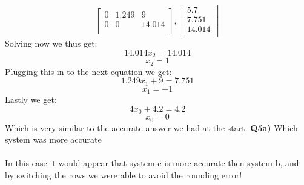 \documentclass[12pt]{article}
\begin{document}
\begin{adjustwidth}{0em}{0pt}
\[\begin{bmatrix}
0 & 1.249 & 9 \\
0 & 0 & 14.014\\
\end{bmatrix}, \begin{bmatrix}
5.7 \\
7.751 \\
14.014 \\
\end{bmatrix}\]
Solving now we thus get:
\[14.014x_2 = 14.014\]
\[x_2 = 1\]
Plugging this in to the next equation we get:
\[ 1.249x_1 + 9 = 7.751\]
\[ x_1 = -1 \]
Lastly we get:
\[ 4x_0 + 4.2 = 4.2 \]
\[ x_0 = 0 \]
Which is very similar to the accurate answer we had at the start.
\textbf{Q5a)} Which system was more accurate \\\\
In this case it would appear that system c is more accurate then system b, and by switching the rows we were able to avoid the rounding error!
\end{adjustwidth}
\end{document}
